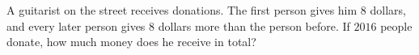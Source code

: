 A guitarist on the street receives donations. The first person gives him $8$ dollars, and every later person gives $8$ dollars more than the person before. If $2016$ people donate, how much money does he receive in total?
